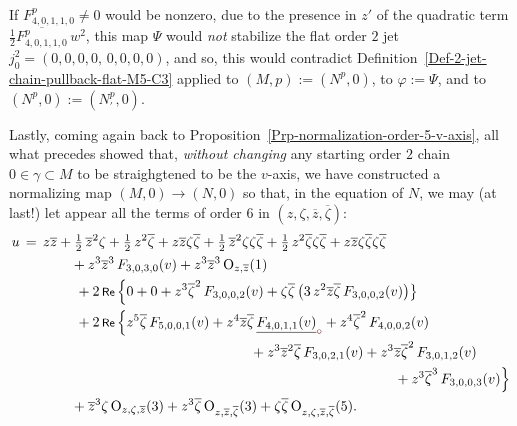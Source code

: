 \documentclass[12pt,twoside,leqno,openany]{amsart}
\begin{document}
If $F_{4,0,1,1,0}^p \neq 0$ would be nonzero, due to the
presence in $z'$ of the quadratic term 
$\frac{1}{2} \overline{F_{4,0,1,1,0}^p}\, w^2$, 
this map $\Psi$ would {\sl not} stabilize the flat order $2$ jet
$j_0^2 = (0, 0, 0, 0, \, 0, 0, 0, 0)$, and so,
this would contradict
Definition~{\ref{Def-2-jet-chain-pullback-flat-M5-C3}} applied
to $(M,p) := (N^p, 0)$, to $\varphi := \Psi$,
and to $(N^p, 0) := (N_\prime^p, 0)$.
\endproof

\label{Moser-normal-C-2-1-hypersurfaces-M5-C3}

Lastly, coming again back to
Proposition~{\ref{Prp-normalization-order-5-v-axis}},
all what precedes showed that,
{\em without changing} any starting order $2$ chain
$0 \in \gamma \subset M$ to be straighgtened to be
the $v$-axis, we have constructed a normalizing map
$(M, 0) \longrightarrow (N, 0)$ 
so that, in the equation of $N$, 
we may (at last!) let appear all the terms of order $6$ in 
$(z, \zeta, \overline{z}, \overline{\zeta})$:
\[
\aligned
u
&
\,=\,
z\overline{z}
+
\tfrac{1}{2}\,\overline{z}^2\zeta
+
\tfrac{1}{2}\,z^2\overline{\zeta}
+
z\overline{z}\zeta\overline{\zeta}
+
\tfrac{1}{2}\,\overline{z}^2\zeta\zeta\overline{\zeta}
+
\tfrac{1}{2}\,z^2\overline{\zeta}\zeta\overline{\zeta}
+
z\overline{z}\zeta\overline{\zeta}\zeta\overline{\zeta}
\\
&
\ \ \ \ \ \ \ \ \ \ \ 
+
z^3\overline{z}^3\,
F_{3,0,3,0}(v)
+
z^3\overline{z}^3\,
{\rm O}_{z,\overline{z}}(1)
\\
&
\ \ \ \ \ \ \ \ \ \ \ \ 
+
2\,\Re\,
\Big\{
0
+
0
+
z^3\overline{\zeta}^2\,
F_{3,0,0,2}(v)
+
\zeta\overline{\zeta}\,
\big(
3\,z^2\overline{z}\overline{\zeta}\,
F_{3,0,0,2}(v)
\big)
\big\}
\\
&
\ \ \ \ \ \ \ \ \ \ \ \ 
+
2\,\Re\,
\Big\{
z^5\overline{\zeta}\,
F_{5,0,0,1}(v)
+
z^4\overline{z}\overline{\zeta}\,
\zero{F_{4,0,1,1}(v)}
+
z^4\overline{\zeta}^2\,
F_{4,0,0,2}(v)
\\
&
\ \ \ \ \ \ \ \ \ \ \ \ \ \ \ \ \ \ \ \ \ \ \ \ \ \ \ \ \ \ \ \ \ \ \ 
\ \ \ \ \ \ \ \ \ \ \ \ \ \ \,
+
z^3\overline{z}^2\overline{\zeta}\,
F_{3,0,2,1}(v)
+
z^3\overline{z}\overline{\zeta}^2\,
F_{3,0,1,2}(v)
\\
&
\ \ \ \ \ \ \ \ \ \ \ \ \ \ \ \ \ \ \ \ \ \ \ \ \ \ \ \ \ \ \ \ \ \ \
\ \ \ \ \ \ \ \ \ \ \ \ \ \ \ \ \ \ \ \ \ \ \ \ \ \ \ \ \ \ \ \ \ \ \
\ \ \ \ \ \ \ \ \ \ \,
+
z^3\overline{\zeta}^3\,
F_{3,0,0,3}(v)
\Big\}
\\
&
\ \ \ \ \ \ \ \ \ \ \ 
+
\overline{z}^3\zeta\,
{\rm O}_{z,\zeta,\overline{z}}(3)
+
z^3\overline{\zeta}\,
{\rm O}_{z,\overline{z},\overline{\zeta}}(3)
+
\zeta\overline{\zeta}\,
{\rm O}_{z,\zeta,\overline{z},\overline{\zeta}}(5).
\endaligned
\]
\end{document}
